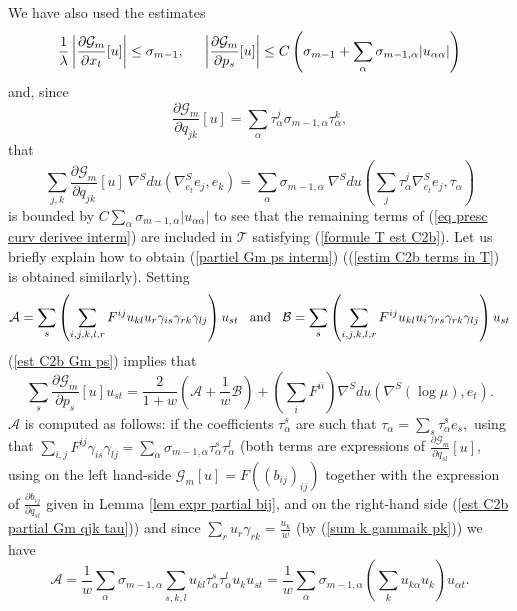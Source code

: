 \documentclass[10pt,reqno,oneside]{amsart}
\theoremstyle{definition}
\theoremstyle{remark}
\begin{document}
We have also used the estimates 
\begin{equation}\label{estim C2b terms in T}
\frac{1}{\lambda}\left|\frac{\partial\mathcal{G}_m}{\partial x_t}[u]\right|\leq \sigma_{m-1},\hspace{.5cm}\left|\frac{\partial\mathcal{G}_m}{\partial p_s}[u]\right|\leq C\left(\sigma_{m-1}+\sum_{\alpha}\sigma_{m-1,\alpha}|u_{\alpha\alpha}|\right)
\end{equation}
and, since
\begin{equation}\label{est C2b partial Gm qjk tau}
\frac{\partial\mathcal{G}_m}{\partial q_{jk}}[u]=\sum_{\alpha}\tau^j_{\alpha}\sigma_{m-1,\alpha}\tau^k_{\alpha},
\end{equation}
that
$$\sum_{j,k}\frac{\partial\mathcal{G}_m}{\partial q_{jk}}[u]\ \nabla^Sdu(\nabla^S_{e_t}e_j,e_k)=\sum_{\alpha}\sigma_{m-1,\alpha}\ \nabla^Sdu(\sum_j\tau^j_\alpha\nabla^S_{e_t}e_j,\tau_{\alpha})$$
is bounded by $C\sum_{\alpha}\sigma_{m-1,\alpha}|u_{\alpha\alpha}|$ to see that the remaining terms of (\ref{eq presc curv derivee interm}) are included in $\mathcal{T}$ satisfying (\ref{formule T est C2b}). Let us briefly explain how to obtain (\ref{partiel Gm ps interm}) ((\ref{estim C2b terms in T}) is obtained similarly). Setting
$$\mathcal{A}=\sum_s\left(\sum_{i,j,k,l,r}F^{ij}u_{kl}u_r\gamma_{is}\gamma_{rk}\gamma_{lj}\right)u_{st}\hspace{.3cm}\mbox{and}\hspace{.3cm}\mathcal{B}=\sum_s\left(\sum_{i,j,k,l,r}F^{ij}u_{kl}u_i\gamma_{rs}\gamma_{rk}\gamma_{lj}\right)u_{st}$$
(\ref{est C2b Gm ps}) implies that
$$\sum_s\frac{\partial\mathcal{G}_m}{\partial p_s}[u]u_{st}=\frac{2}{1+w}\left(\mathcal{A}+\frac{1}{w}\mathcal{B}\right)+(\sum_iF^{ii})\nabla^Sdu(\nabla^S(\log \mu),e_t).$$
$\mathcal{A}$ is computed as follows: if the coefficients $\tau^s_{\alpha}$ are such that $\tau_{\alpha}=\sum_s\tau^s_{\alpha}e_s,$ using that $\sum_{i,j}F^{ij}\gamma_{is}\gamma_{lj}=\sum_{\alpha}\sigma_{m-1,\alpha}\tau^s_{\alpha}\tau^l_{\alpha}$ (both terms are expressions of $\frac{\partial\mathcal{G}_m}{\partial q_{sl}}[u]$, using on the left hand-side $\mathcal{G}_m[u]=F((b_{ij})_{ij})$ together with the expression of $\frac{\partial b_{ij}}{\partial q_{sl}}$ given in Lemma \ref{lem expr partial bij}, and on the right-hand side (\ref{est C2b partial Gm qjk tau})) and since $\sum_ru_r\gamma_{rk}=\frac{u_k}{w}$ (by (\ref{sum k gammaik pk})) we have
$$\mathcal{A}=\frac{1}{w}\sum_{\alpha}\sigma_{m-1,\alpha}\sum_{s,k,l}u_{kl}\tau_{\alpha}^s\tau_{\alpha}^lu_ku_{st}=\frac{1}{w}\sum_{\alpha}\sigma_{m-1,\alpha}\left(\sum_ku_{k\alpha}u_k\right)u_{\alpha t}.$$
\end{document}
